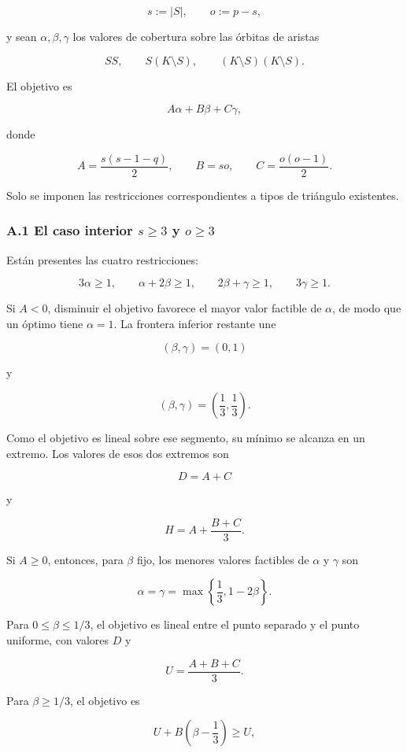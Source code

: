 \documentclass[
  spanish,
  11pt,
  a4paper,
]{article}
\begin{document}
\[
s:=|S|,
\qquad
o:=p-s,
\]

y sean \(\alpha,\beta,\gamma\) los valores de cobertura sobre las órbitas de aristas

\[
SS,\qquad S(K\setminus S),\qquad (K\setminus S)(K\setminus S).
\]

El objetivo es

\[
A\alpha+B\beta+C\gamma,
\]

donde

\[
A=\frac{s(s-1-q)}2,
\qquad
B=so,
\qquad
C=\frac{o(o-1)}2.
\]

Solo se imponen las restricciones correspondientes a tipos de triángulo existentes.

\subsubsection{\texorpdfstring{A.1 El caso interior \(s\ge3\) y \(o\ge3\)}{A.1 El caso interior s\textbackslash ge3 y o\textbackslash ge3}}\label{a.1-el-caso-interior-sge3-y-oge3}

Están presentes las cuatro restricciones:

\[
3\alpha\ge1,
\qquad
\alpha+2\beta\ge1,
\qquad
2\beta+\gamma\ge1,
\qquad
3\gamma\ge1.
\]

Si \(A<0\), disminuir el objetivo favorece el mayor valor factible de \(\alpha\), de modo que un óptimo tiene \(\alpha=1\). La frontera inferior restante une

\[
(\beta,\gamma)=(0,1)
\]

y

\[
(\beta,\gamma)=\left(\frac13,\frac13\right).
\]

Como el objetivo es lineal sobre ese segmento, su mínimo se alcanza en un extremo. Los valores de esos dos extremos son

\[
D=A+C
\]

y

\[
H=A+\frac{B+C}{3}.
\]

Si \(A\ge0\), entonces, para \(\beta\) fijo, los menores valores factibles de \(\alpha\) y \(\gamma\) son

\[
\alpha=\gamma=\max\left\{\frac13,1-2\beta\right\}.
\]

Para \(0\le\beta\le1/3\), el objetivo es lineal entre el punto separado y el punto uniforme, con valores \(D\) y

\[
U=\frac{A+B+C}{3}.
\]

Para \(\beta\ge1/3\), el objetivo es

\[
U+B\left(\beta-\frac13\right)\ge U,
\]
\end{document}
